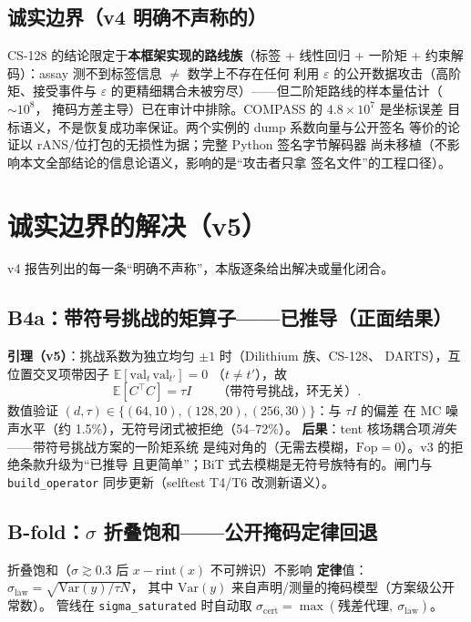 \documentclass[11pt,a4paper]{ctexart}
\begin{document}
\subsection{诚实边界（v4 明确不声称的）}

CS-128 的结论限定于\textbf{本框架实现的路线族}（标签 + 线性回归 +
一阶矩 + 约束解码）：assay 测不到标签信息 $\neq$ 数学上不存在任何
利用 $\varepsilon$ 的公开数据攻击（高阶矩、接受事件与 $\varepsilon$
的更精细耦合未被穷尽）——但二阶矩路线的样本量估计（$\sim10^8$，
掩码方差主导）已在审计中排除。COMPASS 的 $4.8\times10^7$ 是坐标误差
目标语义，不是恢复成功率保证。两个实例的 dump 系数向量与公开签名
等价的论证以 rANS/位打包的无损性为据；完整 Python 签名字节解码器
尚未移植（不影响本文全部结论的信息论语义，影响的是``攻击者只拿
签名文件''的工程口径）。


\section{诚实边界的解决（v5）}

v4 报告列出的每一条``明确不声称''，本版逐条给出解决或量化闭合。

\subsection{B4a：带符号挑战的矩算子——已推导（正面结果）}

\textbf{引理（v5）}：挑战系数为独立均匀 $\pm1$ 时（Dilithium 族、CS-128、
DARTS），互位置交叉项带因子 $\mathbb{E}[\mathrm{val}_t\,\mathrm{val}_{t'}]=0$
（$t\neq t'$），故
\[
\mathbb{E}[C^\top C] = \tau I \qquad\text{（带符号挑战，环无关）}.
\]
数值验证 $(d,\tau)\in\{(64,10),(128,20),(256,30)\}$：与 $\tau I$ 的偏差
在 MC 噪声水平（约 1.5\%），无符号闭式被拒绝（54--72\%）。
\textbf{后果}：tent 核场耦合项\emph{消失}——带符号挑战方案的一阶矩系统
是纯对角的（无需去模糊，$\mathrm{Fop}=0$）。v3 的拒绝条款升级为``已推导
且更简单''；BiT 式去模糊是无符号族特有的。闸门与
\texttt{build\_operator} 同步更新（selftest T4/T6 改测新语义）。

\subsection{B-fold：$\sigma$ 折叠饱和——公开掩码定律回退}

折叠饱和（$\sigma\gtrsim0.3$ 后 $x-\mathrm{rint}(x)$ 不可辨识）不影响
\textbf{定律}值：$\sigma_{\mathrm{law}}=\sqrt{\mathrm{Var}(y)/\tau N}$，
其中 $\mathrm{Var}(y)$ 来自声明/测量的掩码模型（方案级公开常数）。
管线在 \texttt{sigma\_saturated} 时自动取
$\sigma_{\mathrm{cert}}=\max(\text{残差代理},\ \sigma_{\mathrm{law}})$。
\end{document}
